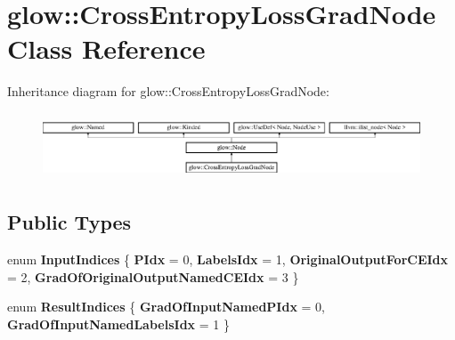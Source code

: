 \hypertarget{classglow_1_1_cross_entropy_loss_grad_node}{}\section{glow\+:\+:Cross\+Entropy\+Loss\+Grad\+Node Class Reference}
\label{classglow_1_1_cross_entropy_loss_grad_node}
Inheritance diagram for glow\+:\+:Cross\+Entropy\+Loss\+Grad\+Node\+:\begin{figure}[H]
\begin{center}
\leavevmode
\includegraphics[height=1.971831cm]{classglow_1_1_cross_entropy_loss_grad_node}
\end{center}
\end{figure}
\subsection*{Public Types}
\begin{DoxyCompactItemize}
\item 
\mbox{\label{classglow_1_1_cross_entropy_loss_grad_node_a37e644fb12888871a3225c72788bb4b3}} 
enum {\bfseries Input\+Indices} \{ {\bfseries P\+Idx} = 0, 
{\bfseries Labels\+Idx} = 1, 
{\bfseries Original\+Output\+For\+C\+E\+Idx} = 2, 
{\bfseries Grad\+Of\+Original\+Output\+Named\+C\+E\+Idx} = 3
 \}
\item 
\mbox{\label{classglow_1_1_cross_entropy_loss_grad_node_a23a694ea484bea355878cb6b9c9a323c}} 
enum {\bfseries Result\+Indices} \{ {\bfseries Grad\+Of\+Input\+Named\+P\+Idx} = 0, 
{\bfseries Grad\+Of\+Input\+Named\+Labels\+Idx} = 1
 \}
\end{DoxyCompactItemize}
